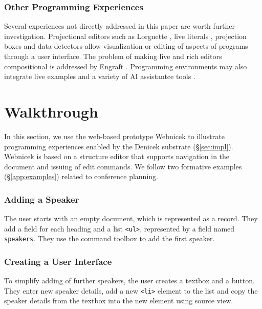 \documentclass[sigconf,anonymous,screen]{acmart}
\newcommand*\circled[1]{\textnormal{\footnotesize\sffamily\bfseries\protect\tikz[baseline=(char.base)]{
  \node[shape=circle,fill=black,text=white,draw,inner sep=1pt] (char) {#1};}}}
\begin{document}
\subsubsection*{Other Programming Experiences}
Several experiences not directly addressed in this paper are worth further investigation.
Projectional editors such as Lorgnette \cite{gobert-2023-lorgnette},
live literals \cite{omar-2021-livelits}, projection boxes \cite{lerner-2020-boxes} and data detectors
\cite{nardi-1998-agents} allow visualization or editing of aspects of programs through a user interface.
The problem of making live and rich editors compositional is addressed by
Engraft \cite{horowitz-2023-engraft}. Programming environments may also integrate
live examples \cite{rauch-2019-babylonian} and a variety of AI assistantce tools \cite{petricek-2023-aias,blinn-2024-llms,mcnutt-2023-nbai}.



\section{Walkthrough}
\label{sec:walk}

In this section, we use the web-based prototype Webnicek to illustrate programming
experiences enabled by the Denicek substrate (\S\ref{sec:impl}). Webnicek is based on a structure
editor that supports navigation in the document and issuing of edit commands. We follow two
formative examples (\S\ref{app:examples}) related to conference planning.

\subsubsection*{\circled{A} Adding a Speaker}
The user starts with an empty document, which is represented as a record. They add a field for
each heading and a list {\small\Verb_<ul>_}, represented by a field named {\small\Verb_speakers_}. They use the command
toolbox to add the first speaker.

\subsubsection*{\circled{B} Creating a User Interface} To simplify adding of
further speakers, the user creates a textbox and a button. They enter new speaker
details, add a new {\small\Verb_<li>_} element to the list and copy the speaker details
from the textbox into the new element using source view.
\end{document}
